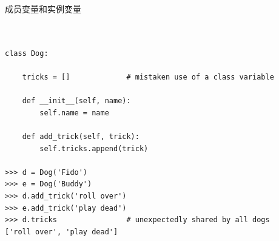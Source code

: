 \documentclass{beamer}
\begin{document}
\begin{frame}[t,fragile]{成员变量和实例变量}


\begin{verbatim}


class Dog:

    tricks = []             # mistaken use of a class variable

    def __init__(self, name):
        self.name = name

    def add_trick(self, trick):
        self.tricks.append(trick)

>>> d = Dog('Fido')
>>> e = Dog('Buddy')
>>> d.add_trick('roll over')
>>> e.add_trick('play dead')
>>> d.tricks                # unexpectedly shared by all dogs
['roll over', 'play dead']


\end{verbatim}


\end{frame}
\end{document}
